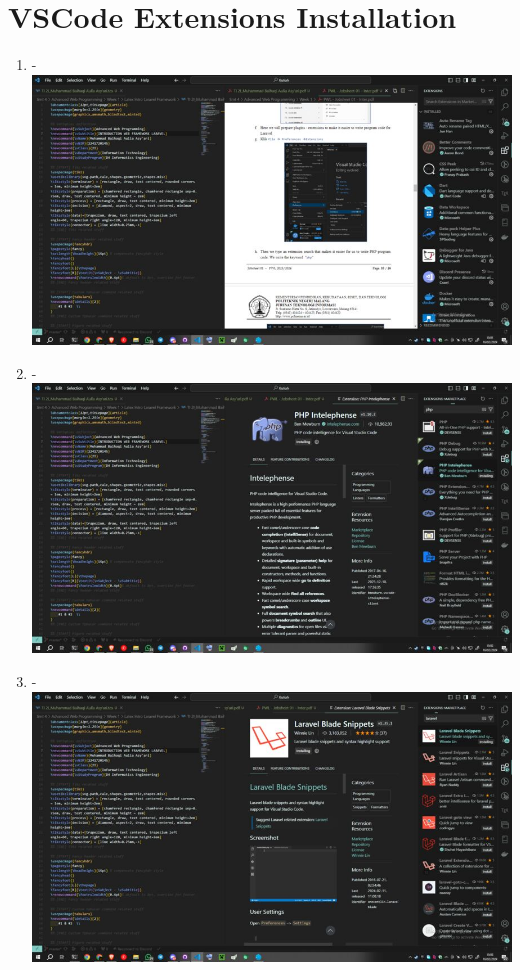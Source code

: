 \documentclass[12pt,titlepage]{article}
\begin{document}
\section{VSCode Extensions Installation}

\begin{enumerate}[label= \alph*.]
    \item - \\ \includegraphics[width=.9\textwidth]{images/figures/VSCode 1.jpg}
    \item - \\ \includegraphics[width=.9\textwidth]{images/figures/VSCode 2.jpg}
    \newpage
    \item - \\ \includegraphics[width=.9\textwidth]{images/figures/VSCode 3.jpg}

\end{enumerate}
\end{document}
